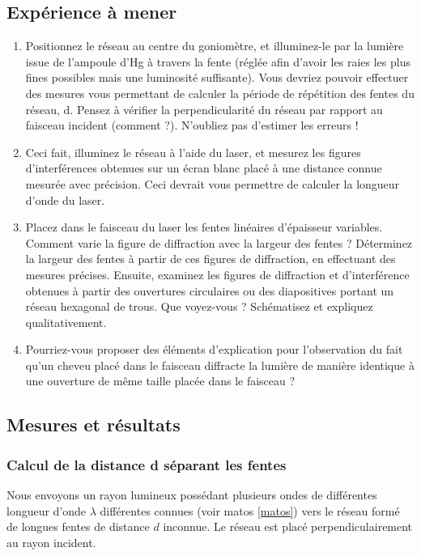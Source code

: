 \documentclass[a4paper,11pt]{article}
\begin{document}
\subsection{Expérience à mener}
\begin{enumerate}
\item Positionnez le réseau au centre du goniomètre, et illuminez-le par la lumière issue de l’ampoule d’Hg à travers la fente (réglée afin d’avoir les raies les plus fines possibles mais une luminosité suffisante). Vous devriez pouvoir effectuer des mesures vous permettant de calculer la période de répétition des fentes du réseau, d. Pensez à vérifier la perpendicularité du réseau par rapport au faisceau incident (comment ?). N’oubliez pas d’estimer les erreurs !
\item Ceci fait, illuminez le réseau à l’aide du laser, et mesurez les figures d’interférences obtenues sur un écran blanc placé à une distance connue mesurée avec précision. Ceci devrait vous permettre de calculer la longueur d’onde du laser.
\item Placez dans le faisceau du laser les fentes linéaires d’épaisseur variables. Comment varie la figure de diffraction avec la largeur des fentes ? Déterminez la largeur des fentes à partir de ces figures de diffraction, en effectuant des mesures précises. Ensuite, examinez les figures de diffraction et d’interférence obtenues à partir des ouvertures circulaires ou
des diapositives portant un réseau hexagonal de trous. Que voyez-vous ? Schématisez et expliquez qualitativement.

\item Pourriez-vous proposer des éléments d’explication pour l’observation du fait qu’un cheveu placé dans le faisceau diffracte
la lumière de manière identique à une ouverture de même taille placée dans le faisceau ?
\end{enumerate}

\subsection{Mesures et résultats}
	\subsubsection{Calcul de la distance d séparant les fentes}
	Nous envoyons un rayon lumineux possédant plusieurs ondes de différentes longueur d'onde $\lambda$ différentes connues (voir matos \ref{matos}) vers le réseau formé de longues fentes de distance $d$ inconnue. Le réseau est placé perpendiculairement au rayon incident. 
	
\end{document}
